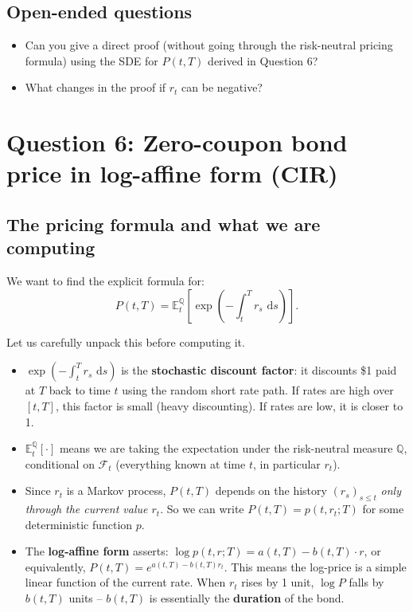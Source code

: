 \documentclass[11pt]{article}
\newcommand{\QQ}{\mathbb{Q}}
\newcommand{\EE}{\mathbb{E}}
\newcommand{\FF}{\mathcal{F}}
\newcommand{\dd}{\,\mathrm{d}}
\begin{document}
\subsection*{Open-ended questions}
\begin{itemize}
  \item Can you give a direct proof (without going through the risk-neutral
  pricing formula) using the SDE for $P(t,T)$ derived in Question 6?
  \item What changes in the proof if $r_t$ can be negative?
\end{itemize}

\newpage
\section{Question 6: Zero-coupon bond price in log-affine form (CIR)}

\subsection{The pricing formula and what we are computing}

We want to find the explicit formula for:
\[
P(t,T)
= \EE_t^\QQ\!\left[\exp\!\left(-\int_t^T r_s\,\dd s\right)\right].
\]

Let us carefully unpack this before computing it.

\begin{itemize}
  \item $\exp\!\left(-\int_t^T r_s\,\dd s\right)$ is the \textbf{stochastic
  discount factor}: it discounts \$1 paid at $T$ back to time $t$ using the
  random short rate path.  If rates are high over $[t,T]$, this factor is
  small (heavy discounting).  If rates are low, it is closer to 1.

  \item $\EE_t^\QQ[\cdot]$ means we are taking the expectation under the
  risk-neutral measure $\QQ$, conditional on $\FF_t$ (everything known at
  time $t$, in particular $r_t$).

  \item Since $r_t$ is a Markov process, $P(t,T)$ depends on the history
  $(r_s)_{s\le t}$ \emph{only through the current value $r_t$}.  So we can
  write $P(t,T) = p(t,r_t;T)$ for some deterministic function $p$.

  \item The \textbf{log-affine form} asserts:
  $\log p(t,r;T) = a(t,T) - b(t,T)\cdot r$, or equivalently,
  $P(t,T) = e^{a(t,T)-b(t,T)r_t}$.  This means the log-price is a
  simple linear function of the current rate.  When $r_t$ rises by 1 unit,
  $\log P$ falls by $b(t,T)$ units -- $b(t,T)$ is essentially the
  \textbf{duration} of the bond.
\end{itemize}
\end{document}
